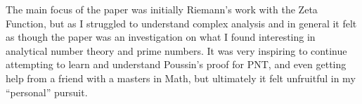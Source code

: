 
	The main focus of the paper was initially Riemann's work with the Zeta Function, but as I struggled to understand complex analysis and in general it felt as though the paper was an investigation on what I found interesting in analytical number theory and prime numbers. It was very inspiring to continue attempting to learn and understand Poussin's proof for PNT, and even getting help from a friend with a masters in Math, but ultimately it felt unfruitful in my ``personal'' pursuit.
